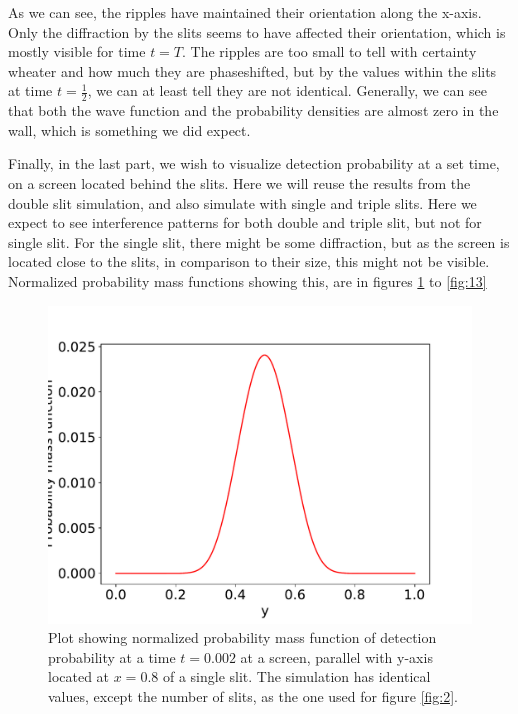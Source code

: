 \documentclass[english,notitlepage,reprint,nofootinbib]{revtex4-1}  %
\begin{document}
As we can see, the ripples have maintained their orientation along the x-axis. Only the diffraction by the slits seems to have affected their orientation, which is mostly visible for time $t=T$. The ripples are too small to tell with certainty wheater and how much they are phaseshifted, but by the values within the slits at time $t=\frac{1}{2}$, we can at least tell they are not identical. Generally, we can see that both the wave function and the probability densities are almost zero in the wall, which is something we did expect.

Finally, in the last part, we wish to visualize detection probability at a set time, on a screen located behind the slits. Here we will reuse the results from the double slit simulation, and also simulate with single and triple slits. Here we expect to see interference patterns for both double and triple slit, but not for single slit. For the single slit, there might be some diffraction, but as the screen is located close to the slits, in comparison to their size, this might not be visible. Normalized probability mass functions showing this, are in figures \ref{fig:11} to \ref{fig:13}

\begin{figure}[h!]
    \centering %
    \includegraphics[scale=0.35]{figures/1D_1.pdf} %
    \caption{Plot showing normalized probability mass function of detection probability at a time $t=0.002$ at a screen, parallel with y-axis located at $x=0.8$ of a single slit. The simulation has identical values, except the number of slits, as the one used for figure \ref{fig:2}.}
    \label{fig:11}
\end{figure}
\FloatBarrier
\end{document}
